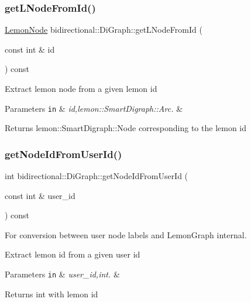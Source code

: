 \subsubsection{\texorpdfstring{get\+L\+Node\+From\+Id()}{getLNodeFromId()}}
{\footnotesize\ttfamily \hyperlink{digraph_8h_a952c6b935f7521c3435dbd13b255246b}{Lemon\+Node} bidirectional\+::\+Di\+Graph\+::get\+L\+Node\+From\+Id (\begin{DoxyParamCaption}\item[{const int \&}]{id }\end{DoxyParamCaption}) const\hspace{0.3cm}{\ttfamily [inline]}}

Extract lemon node from a given lemon id


\begin{DoxyParams}[1]{Parameters}
\mbox{\tt in}  & {\em id,lemon\+::\+Smart\+Digraph\+::\+Arc.} & \\
\hline
\end{DoxyParams}
\begin{DoxyReturn}{Returns}
lemon\+::\+Smart\+Digraph\+::\+Node corresponding to the lemon id 
\end{DoxyReturn}
\mbox{\label{classbidirectional_1_1DiGraph_a9b6d435d6eac3751da5b2ee427826657}} 
\subsubsection{\texorpdfstring{get\+Node\+Id\+From\+User\+Id()}{getNodeIdFromUserId()}}
{\footnotesize\ttfamily int bidirectional\+::\+Di\+Graph\+::get\+Node\+Id\+From\+User\+Id (\begin{DoxyParamCaption}\item[{const int \&}]{user\+\_\+id }\end{DoxyParamCaption}) const}



For conversion between user node labels and Lemon\+Graph internal. 

Extract lemon id from a given user id


\begin{DoxyParams}[1]{Parameters}
\mbox{\tt in}  & {\em user\+\_\+id,int.} & \\
\hline
\end{DoxyParams}
\begin{DoxyReturn}{Returns}
int with lemon id 
\end{DoxyReturn}
\mbox{\label{classbidirectional_1_1DiGraph_a45a3d6b4164c0881cdad5ab23aa9eda8}} 
